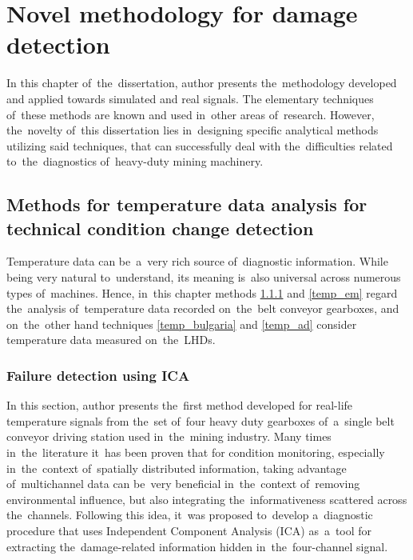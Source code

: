 

\chapter{Novel methodology for damage detection}\label{methodology}

In this chapter of~the~dissertation, author presents the~methodology developed and applied towards simulated and real signals. The elementary techniques of~these methods are known and used in~other areas of~research. However, the~novelty of~this dissertation lies in~designing specific analytical methods utilizing said techniques, that can successfully deal with the~difficulties related to~the~diagnostics of~heavy-duty mining machinery.

\section{Methods for temperature data analysis for technical condition change detection}\label{temps}

Temperature data can be~a~very rich source of~diagnostic information. While being very natural to~understand, its meaning is~also universal across numerous types of~machines. Hence, in~this chapter methods \ref{temp_ica} and \ref{temp_em} regard the~analysis of~temperature data recorded on~the~belt conveyor gearboxes, and on~the~other hand techniques \ref{temp_bulgaria} and \ref{temp_ad} consider temperature data measured on~the~LHDs. 

\subsection{Failure detection using ICA}\label{temp_ica}

In this section, author presents the~first method developed for real-life temperature signals from the~set of~four heavy duty gearboxes of~a~single belt conveyor driving station used in~the~mining industry. Many times in~the~literature it~has been proven that for condition monitoring, especially in~the~context of~spatially distributed information, taking advantage of~multichannel data can be~very beneficial in~the~context of~removing environmental influence, but also integrating the~informativeness scattered across the~channels. Following this idea, it~was proposed to~develop a~diagnostic procedure that uses Independent Component Analysis (ICA) as~a~tool for extracting the~damage-related information hidden in~the~four-channel signal. 


